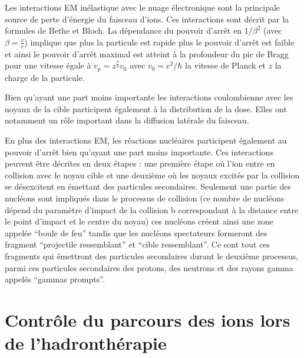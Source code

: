 \documentclass[11pt,a4paper,oldfontcommands]{memoir}
\begin{document}
Les interactions EM inélastique avec le nuage électronique sont la principale source de perte d'énergie du faisceau d'ions.  Ces interactions sont décrit par la formules de Bethe et Bloch. La dépendance du pouvoir d'arrêt en $1/\beta^2$ (avec $\beta = \frac{v}{c}$) implique que plus la particule est rapide plus le pouvoir d'arrêt est faible et ainsi le pouvoir d'arrêt maximal est atteint à la profondeur du pic de Bragg pour une vitesse égale à $v_p = z^{\frac{2}{3}}v_0$ avec $v_0 = e^2/\hbar$ la vitesse de Planck et $z$ la charge de la particule. 

Bien qu'ayant une part moins importante les interactions coulombienne avec les noyaux de la cible participent également à la distribution de la dose. Elles ont notamment un rôle important dans la diffusion latérale du faisceau.

En plus des interactions EM, les réactions nucléaires participent également au pouvoir d'arrêt bien qu'ayant une part moins importante. Ces interactions peuvent être décrites en deux étapes : une première étape où l'ion entre en collision avec le noyau cible et une deuxième où les noyaux excités par la collision se désexcitent en émettant des particules secondaires. Seulement une partie des nucléons sont impliqués dans le processus de collision (ce nombre de nucléons dépend du paramètre d'impact de la collision b correspondant à la distance entre le point d'impact et le centre du noyau) ces nucléons créent ainsi une zone appelée \enquote{boule de feu} tandis que les nucléons spectateurs formeront des fragment \enquote{projectile ressemblant} et \enquote{cible ressemblant}. Ce sont tout ces fragments qui émettront des particules secondaires durant le deuxième processus, parmi ces particules secondaires des protons, des neutrons et des rayons gamma appelés \enquote{gammas prompts}. %


\openany
\section{Contrôle du parcours des ions lors de l'hadronthérapie}
\end{document}
